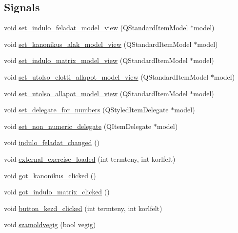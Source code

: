 \subsection*{Signals}
\begin{DoxyCompactItemize}
\item 
void \hyperlink{classSimplex__method__calculator_a7a891278c81b5abf08534e8e977cc5da}{set\+\_\+indulo\+\_\+feladat\+\_\+model\+\_\+view} (Q\+Standard\+Item\+Model $\ast$model)
\item 
void \hyperlink{classSimplex__method__calculator_ab650c082dc6d77daeb71a8484a937b3c}{set\+\_\+kanonikus\+\_\+alak\+\_\+model\+\_\+view} (Q\+Standard\+Item\+Model $\ast$model)
\item 
void \hyperlink{classSimplex__method__calculator_a414ab50c10e3038948ada77e03eb6818}{set\+\_\+indulo\+\_\+matrix\+\_\+model\+\_\+view} (Q\+Standard\+Item\+Model $\ast$model)
\item 
void \hyperlink{classSimplex__method__calculator_ada5d63842a5aa2e704909edf585688f9}{set\+\_\+utolso\+\_\+elotti\+\_\+allapot\+\_\+model\+\_\+view} (Q\+Standard\+Item\+Model $\ast$model)
\item 
void \hyperlink{classSimplex__method__calculator_ae5df4e3026a10daf4206aa64d678bbed}{set\+\_\+utolso\+\_\+allapot\+\_\+model\+\_\+view} (Q\+Standard\+Item\+Model $\ast$model)
\item 
void \hyperlink{classSimplex__method__calculator_a7100231e1d6a4da05a79f5aaeeb2a693}{set\+\_\+delegate\+\_\+for\+\_\+numbers} (Q\+Styled\+Item\+Delegate $\ast$model)
\item 
void \hyperlink{classSimplex__method__calculator_a71ee0dcab8e7d2b4df8daeb9345abf86}{set\+\_\+non\+\_\+numeric\+\_\+delegate} (Q\+Item\+Delegate $\ast$model)
\item 
void \hyperlink{classSimplex__method__calculator_a987270e992fc3f7cdb122579d4f8a400}{indulo\+\_\+feladat\+\_\+changed} ()
\item 
void \hyperlink{classSimplex__method__calculator_a47a8a303560fb07d57db24412971c72b}{external\+\_\+exercise\+\_\+loaded} (int termteny, int korlfelt)
\item 
void \hyperlink{classSimplex__method__calculator_a078f1874b0679d00afb935543b2c7da7}{got\+\_\+kanonikus\+\_\+clicked} ()
\item 
void \hyperlink{classSimplex__method__calculator_a4b3ebd66ccdae0e7750932c3d0538a5c}{got\+\_\+indulo\+\_\+matrix\+\_\+clicked} ()
\item 
void \hyperlink{classSimplex__method__calculator_a613397cef68d30591bd601226e292594}{button\+\_\+kezd\+\_\+clicked} (int termteny, int korlfelt)
\item 
void \hyperlink{classSimplex__method__calculator_a144e4f03c601f1eec42738dfe555f23e}{szamoldvegig} (bool vegig)
\end{DoxyCompactItemize}
